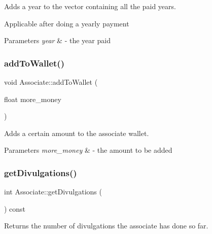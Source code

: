 Adds a year to the vector containing all the paid years. 

Applicable after doing a yearly payment


\begin{DoxyParams}{Parameters}
{\em year} & -\/ the year paid \\
\hline
\end{DoxyParams}
\mbox{\label{classAssociate_a3fcb7919843353de4d4591b2bd627189}} 
\subsubsection{\texorpdfstring{add\+To\+Wallet()}{addToWallet()}}
{\footnotesize\ttfamily void Associate\+::add\+To\+Wallet (\begin{DoxyParamCaption}\item[{float}]{more\+\_\+money }\end{DoxyParamCaption})}



Adds a certain amount to the associate wallet. 


\begin{DoxyParams}{Parameters}
{\em more\+\_\+money} & -\/ the amount to be added \\
\hline
\end{DoxyParams}
\mbox{\label{classAssociate_a2ee36cec1d42559fdd1f9afe7ff85b2b}} 
\subsubsection{\texorpdfstring{get\+Divulgations()}{getDivulgations()}}
{\footnotesize\ttfamily int Associate\+::get\+Divulgations (\begin{DoxyParamCaption}{ }\end{DoxyParamCaption}) const}



Returns the number of divulgations the associate has done so far. 

\mbox{\label{classAssociate_acef0ddff899cbca55e3b19abc67f1800}} 
